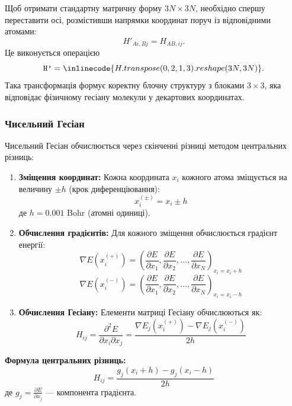 {\begin{commentbox}
Щоб отримати стандартну матричну форму $3N \times 3N$,
необхідно спершу переставити осі, розмістивши напрямки координат поруч із
відповідними атомами:
\[
H'_{Ai,Bj} = H_{AB,ij}.
\]
Це виконується операцією
\[
\texttt{H'} = \inlinecode{H.transpose(0,2,1,3).reshape(3N,3N)}.
\]
Така трансформація формує коректну блочну структуру з блоками $3\times3$,
яка відповідає фізичному гесіану молекули у декартових координатах.
\end{commentbox}

\subsubsection{Чисельний Гесіан}

Чисельний Гесіан обчислюється через скінченні різниці методом центральних різниць:

\begin{enumerate}
    \item \textbf{Зміщення координат:} Кожна координата $x_i$ кожного атома зміщується на величину $\pm h$ (крок диференціювання):
    \begin{equation}
        x_i^{(\pm)} = x_i \pm h
    \end{equation}
    де $h = 0.001$ Bohr (атомні одиниці).

    \item \textbf{Обчислення градієнтів:} Для кожного зміщення обчислюється градієнт енергії:
    \begin{equation}
        \nabla E(x_i^{(+)}) = \left( \frac{\partial E}{\partial x_1}, \frac{\partial E}{\partial x_2}, \ldots, \frac{\partial E}{\partial x_N} \right)_{x_i = x_i + h}
    \end{equation}
    \begin{equation}
        \nabla E(x_i^{(-)}) = \left( \frac{\partial E}{\partial x_1}, \frac{\partial E}{\partial x_2}, \ldots, \frac{\partial E}{\partial x_N} \right)_{x_i = x_i - h}
    \end{equation}

    \item \textbf{Обчислення Гесіану:} Елементи матриці Гесіану обчислюються як:
    \begin{equation}
        H_{ij} = \frac{\partial^2 E}{\partial x_i \partial x_j} = \frac{\nabla E_j(x_i^{(+)}) - \nabla E_j(x_i^{(-)})}{2h}
    \end{equation}
\end{enumerate}

\textbf{Формула центральних різниць:}
\begin{equation}
    \boxed{H_{ij} = \frac{g_j(x_i + h) - g_j(x_i - h)}{2h}}
\end{equation}
де $g_j = \frac{\partial E}{\partial x_j}$ --- компонента градієнта.

}
